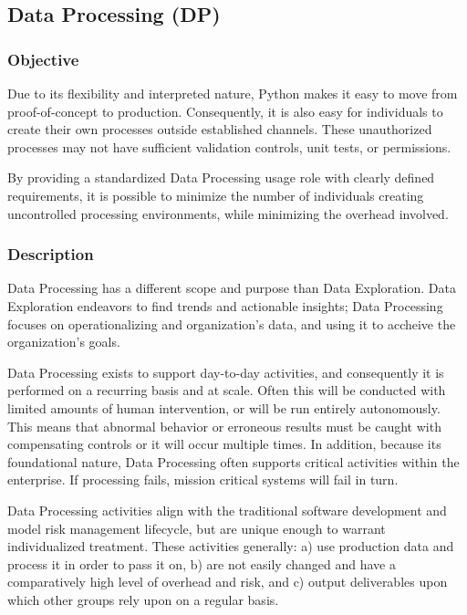 	\subsection{Data Processing (DP)}

		\subsubsection{Objective}

			Due to its flexibility and interpreted nature, Python makes it easy to move from proof-of-concept to production. Consequently, it is also easy for individuals to create their own processes outside established channels. These unauthorized processes may not have sufficient validation controls, unit tests, or permissions.

			By providing a standardized Data Processing usage role with clearly defined requirements, it is possible to minimize the number of individuals creating uncontrolled processing environments, while minimizing the overhead involved.

		\subsubsection{Description}

			Data Processing has a different scope and purpose than Data Exploration. Data Exploration endeavors to find trends and actionable insights; Data Processing focuses on operationalizing and organization's data, and using it to accheive the organization's goals.  

			Data Processing exists to support day-to-day activities, and consequently it is performed on a recurring basis and at scale. Often this will be conducted with limited amounts of human intervention, or will be run entirely autonomously. This means that abnormal behavior or erroneous results must be caught with compensating controls or it will occur multiple times. In addition, because its foundational nature, Data Processing often supports critical activities within the enterprise. If processing fails, mission critical systems will fail in turn.

			Data Processing activities align with the traditional software development and model risk management lifecycle, but are unique enough to warrant individualized treatment. These activities generally: a) use production data and process it in order to pass it on, b) are not easily changed and have a comparatively high level of overhead and risk, and c) output deliverables upon which other groups rely upon on a regular basis.

